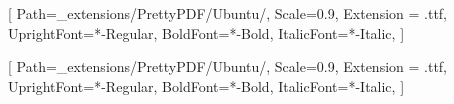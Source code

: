 \setsansfont{Ubuntu}[
    Path=_extensions/PrettyPDF/Ubuntu/,
    Scale=0.9,
    Extension = .ttf,
    UprightFont=*-Regular,
    BoldFont=*-Bold,
    ItalicFont=*-Italic,
    ]

\setmainfont{Ubuntu}[
    Path=_extensions/PrettyPDF/Ubuntu/,
    Scale=0.9,
    Extension = .ttf,
    UprightFont=*-Regular,
    BoldFont=*-Bold,
    ItalicFont=*-Italic,
    ]
